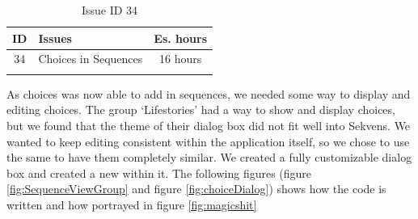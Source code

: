 \begin{longtable} { | c | p{12cm} | c | } 
\hline
	ID 	&	Issues	&		 Es. hours \\\hline
	34 	&	Choices in Sequences	&	16 hours \\\hline
\caption{Issue ID 34}
\label{tab:spr3_choicesinsequences}
\end{longtable}

As choices was now able to add in sequences, we needed some way to display and editing choices.  The group `Lifestories' had a way to show and display choices, but we found that the theme of their dialog box did not fit well into Sekvens. We wanted to keep editing consistent within the application itself, so we chose to use the same  to have them completely similar. We created a fully customizable dialog box and created a new  within it. The following figures (figure \ref{fig:SequenceViewGroup} and figure \ref{fig:choiceDialog}) shows how the code is written and how portrayed in figure \ref{fig:magicshit}

